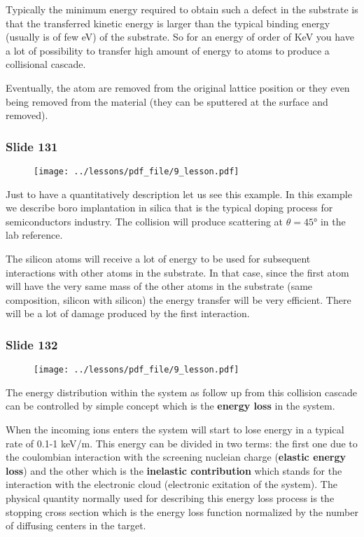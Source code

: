\documentclass[../main/main.tex]{subfiles}
\begin{document}
Typically the minimum energy required to obtain such a defect in the substrate is that the transferred kinetic energy is larger than the typical binding energy (usually is of few eV) of the substrate.
So for an energy of order of KeV you have a lot of possibility to transfer high amount of energy to atoms to produce a collisional cascade.

Eventually, the atom are removed from the original lattice position or they even being removed from the material (they can be sputtered at the surface and removed).

\newpage

\subsubsection{Slide 131}

\begin{figure}[h!]
\centering
\texttt{[image: ../lessons/pdf\_file/9\_lesson.pdf]}
\end{figure}

Just to have a quantitatively description let us see this example.
In this example we describe boro implantation in silica that is the typical doping process for semiconductors industry. The collision will produce scattering at \( \theta = 45° \) in the lab reference.

The silicon atoms will receive a lot of energy to be used for subsequent interactions with other atoms in the substrate. In that case, since the first atom will have the very same mass of the other atoms in the substrate (same composition, silicon with silicon) the energy transfer will be very efficient. There will be a lot of damage produced by the first interaction.

\newpage

\subsubsection{Slide 132}

\begin{figure}[h!]
\centering
\texttt{[image: ../lessons/pdf\_file/9\_lesson.pdf]}
\end{figure}

The energy distribution within the system as follow up from this collision cascade can be controlled by simple concept which is the \textbf{energy loss} in the system.

When the incoming ions enters the system will start to lose energy  in a typical rate of 0.1-1 keV/m. This energy can be divided in two terms: the first one due to the coulombian interaction with the screening nucleian charge (\textbf{elastic energy loss}) and the other which is the \textbf{inelastic contribution} which stands for the interaction with the electronic cloud (electronic exitation of the system). The physical quantity normally used for describing this energy loss process is the stopping cross section which is the energy loss function normalized by the number of diffusing centers in the target.
\end{document}
